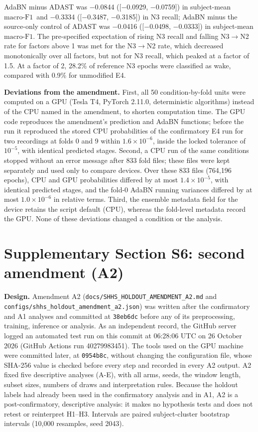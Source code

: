 \documentclass[10pt,a4paper]{article}
\newcommand{\mf}{\ensuremath{\mathrm{macro\text{-}F1}}}
\begin{document}
AdaBN minus ADAST was $-$0.0844 ($[$$-$0.0929, $-$0.0759$]$) in subject-mean \mf\ and $-$0.3334 ($[$$-$0.3487, $-$0.3185$]$) in N3 recall; AdaBN minus the source-only
control of ADAST was $-$0.0416 ($[$$-$0.0498, $-$0.0333$]$) in subject-mean \mf.
The pre-specified expectation of rising N3 recall and falling N3$\to$N2 rate for factors above 1 was met
for the N3$\to$N2 rate, which decreased monotonically over all factors, but not for N3 recall, which
peaked at a factor of 1.5. At a factor of 2, 28.2\% of reference N3 epochs were classified as wake,
compared with 0.9\% for unmodified E4.

\textbf{Deviations from the amendment.} First, all 50 condition-by-fold units were computed on a GPU
(Tesla T4, PyTorch 2.11.0, deterministic algorithms) instead of the CPU named in the amendment, to
shorten computation time. The GPU code reproduces the amendment's prediction and AdaBN
functions; before the run it reproduced the stored CPU probabilities of the confirmatory E4 run for two
recordings at folds 0 and 9 within $1.6\times10^{-6}$, inside the locked tolerance of $10^{-5}$, with
identical predicted stages. Second, a CPU run of the same conditions stopped without an error message after 833 fold files; these files were
kept separately and used only to compare devices. Over these 833 files (764{,}196 epochs), CPU and GPU
probabilities differed by at most $1.4\times10^{-5}$, with identical predicted stages, and the fold-0
AdaBN running variances differed by at most $1.0\times10^{-6}$ in relative terms. Third, the ensemble
metadata field for the device retains the script default (CPU), whereas the fold-level metadata record
the GPU. None of these deviations changed a condition or the analysis.

\section*{Supplementary Section S6: second amendment (A2)}
\label{sec:sup_a2}

\textbf{Design.} Amendment A2 (\nolinkurl{docs/SHHS_HOLDOUT_AMENDMENT_A2.md} and
\nolinkurl{configs/shhs_holdout_amendment_a2.json}) was written after the confirmatory and A1 analyses
and committed at \texttt{38eb6dc} before any of its preprocessing, training, inference or analysis. As an independent record, the GitHub server logged an automated test run on this commit
at 06:28:06 UTC on 26 October 2026 (GitHub Actions run 40279983451). The tools used on the GPU machine
were committed later, at \texttt{0954b8c}, without changing the configuration file, whose SHA-256 value
is checked before every step and recorded in every A2 output. A2 fixed five descriptive analyses
(A-E), with all arms, seeds, the window length, subset sizes, numbers of draws and interpretation rules.
Because the holdout labels had already been used in the confirmatory analysis and in A1, A2 is a
post-confirmatory, descriptive analysis: it makes no hypothesis tests and does not retest or
reinterpret H1--H3. Intervals are paired subject-cluster bootstrap intervals (10{,}000 resamples, seed
2043).
\end{document}
